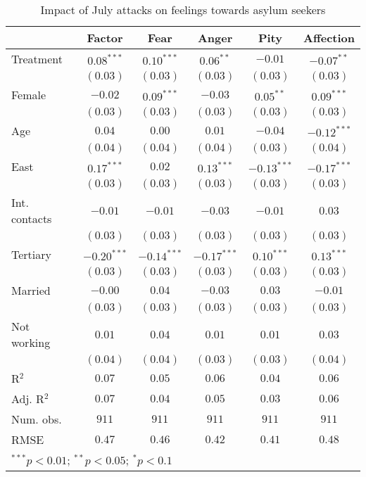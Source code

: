 
\begin{table}
\caption{Impact of July attacks on feelings towards asylum seekers}
\begin{center}
\begin{tabular}{l c c c c c}
\toprule
 & Factor & Fear & Anger & Pity & Affection \\
\midrule
Treatment     & $0.08^{***}$  & $0.10^{***}$  & $0.06^{**}$   & $-0.01$       & $-0.07^{**}$  \\
              & $(0.03)$      & $(0.03)$      & $(0.03)$      & $(0.03)$      & $(0.03)$      \\
Female        & $-0.02$       & $0.09^{***}$  & $-0.03$       & $0.05^{**}$   & $0.09^{***}$  \\
              & $(0.03)$      & $(0.03)$      & $(0.03)$      & $(0.03)$      & $(0.03)$      \\
Age           & $0.04$        & $0.00$        & $0.01$        & $-0.04$       & $-0.12^{***}$ \\
              & $(0.04)$      & $(0.04)$      & $(0.04)$      & $(0.03)$      & $(0.04)$      \\
East          & $0.17^{***}$  & $0.02$        & $0.13^{***}$  & $-0.13^{***}$ & $-0.17^{***}$ \\
              & $(0.03)$      & $(0.03)$      & $(0.03)$      & $(0.03)$      & $(0.03)$      \\
Int. contacts & $-0.01$       & $-0.01$       & $-0.03$       & $-0.01$       & $0.03$        \\
              & $(0.03)$      & $(0.03)$      & $(0.03)$      & $(0.03)$      & $(0.03)$      \\
Tertiary      & $-0.20^{***}$ & $-0.14^{***}$ & $-0.17^{***}$ & $0.10^{***}$  & $0.13^{***}$  \\
              & $(0.03)$      & $(0.03)$      & $(0.03)$      & $(0.03)$      & $(0.03)$      \\
Married       & $-0.00$       & $0.04$        & $-0.03$       & $0.03$        & $-0.01$       \\
              & $(0.03)$      & $(0.03)$      & $(0.03)$      & $(0.03)$      & $(0.03)$      \\
Not working   & $0.01$        & $0.04$        & $0.01$        & $0.01$        & $0.03$        \\
              & $(0.04)$      & $(0.04)$      & $(0.03)$      & $(0.03)$      & $(0.04)$      \\
\midrule
R$^2$         & $0.07$        & $0.05$        & $0.06$        & $0.04$        & $0.06$        \\
Adj. R$^2$    & $0.07$        & $0.04$        & $0.05$        & $0.03$        & $0.06$        \\
Num. obs.     & $911$         & $911$         & $911$         & $911$         & $911$         \\
RMSE          & $0.47$        & $0.46$        & $0.42$        & $0.41$        & $0.48$        \\
\bottomrule
\multicolumn{6}{l}{\scriptsize{$^{***}p<0.01$; $^{**}p<0.05$; $^{*}p<0.1$}}
\end{tabular}
\label{tab_emo_no_nice}
\end{center}
\end{table}

